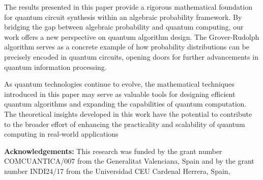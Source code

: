 \documentclass[a4paper,11pt]{article}
\begin{document}
The results presented in this paper provide a rigorous mathematical foundation for quantum circuit synthesis within an algebraic probability framework. By bridging the gap between algebraic probability and quantum computing, our work offers a new perspective on quantum algorithm design. The Grover-Rudolph algorithm serves as a concrete example of how probability distributions can be precisely encoded in quantum circuits, opening doors for further advancements in quantum information processing.

\bigskip

As quantum technologies continue to evolve, the mathematical techniques introduced in this paper may serve as valuable tools for designing efficient quantum algorithms and expanding the capabilities of quantum computation. The theoretical insights developed in this work have the potential to contribute to the broader effort of enhancing the practicality and scalability of quantum computing in real-world applications

\bigskip

\noindent \textbf{Acknowledgements:} This research was funded by the grant number COMCUANTICA/007 from the Generalitat Valenciana, Spain and by the grant number INDI24/17 from the Universidad CEU Cardenal Herrera, Spain,
\end{document}
